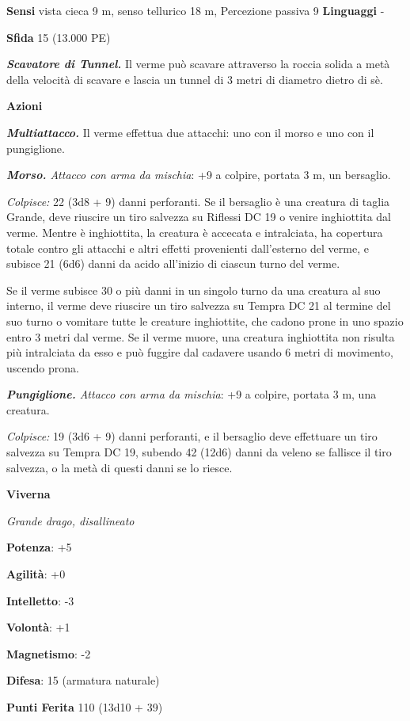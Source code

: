 \begin{multicols}{2}
\textbf{Sensi} vista cieca 9 m, senso tellurico 18 m, Percezione passiva
9 \textbf{Linguaggi} -

\textbf{Sfida} 15 (13.000 PE)

\emph{\textbf{Scavatore di Tunnel.}} Il verme può scavare attraverso la
roccia solida a metà della velocità di scavare e lascia un tunnel di 3
metri di diametro dietro di sè.

\textbf{Azioni}

\emph{\textbf{Multiattacco.}} Il verme effettua due attacchi: uno con il
morso e uno con il pungiglione.

\emph{\textbf{Morso.} Attacco con arma da mischia}: +9 a colpire,
portata 3 m, un bersaglio.

\emph{Colpisce:} 22 (3d8 + 9) danni perforanti. Se il bersaglio è una
creatura di taglia Grande, deve riuscire un tiro salvezza su Riflessi
DC 19 o venire inghiottita dal verme. Mentre è inghiottita, la creatura
è accecata e intralciata, ha copertura totale contro gli attacchi e
altri effetti provenienti dall'esterno del verme, e subisce 21 (6d6)
danni da acido all'inizio di ciascun turno del verme.

Se il verme subisce 30 o più danni in un singolo turno da una creatura
al suo interno, il verme deve riuscire un tiro salvezza su Tempra
DC 21 al termine del suo turno o vomitare tutte le creature inghiottite,
che cadono prone in uno spazio entro 3 metri dal verme. Se il verme
muore, una creatura inghiottita non risulta più intralciata da esso e
può fuggire dal cadavere usando 6 metri di movimento, uscendo prona.

\emph{\textbf{Pungiglione.} Attacco con arma da mischia}: +9 a colpire,
portata 3 m, una creatura.

\emph{Colpisce:} 19 (3d6 + 9) danni perforanti, e il bersaglio deve
effettuare un tiro salvezza su Tempra DC 19, subendo 42 (12d6)
danni da veleno se fallisce il tiro salvezza, o la metà di questi danni
se lo riesce.

\textbf{Viverna}

\emph{Grande drago, disallineato}

\textbf{Potenza}: +5

\textbf{Agilità}: +0

\textbf{Intelletto}: -3

\textbf{Volontà}: +1

\textbf{Magnetismo}: -2

\textbf{Difesa}: 15 (armatura naturale)

\textbf{Punti Ferita} 110 (13d10 + 39)


\end{multicols}
